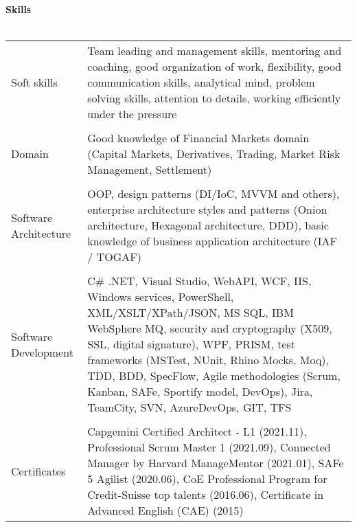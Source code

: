 \textbf{Skills}
\\
\\
\begin{tabular}{p{}|p{}}
Soft skills
& Team leading and management skills, mentoring and coaching, good organization of work, flexibility, good communication skills, analytical mind, problem solving skills, attention to details, working efficiently under the pressure \\
& \\
Domain
& Good knowledge of Financial Markets domain (Capital Markets, Derivatives, Trading, Market Risk Management, Settlement)\\
& \\
Software Architecture
& OOP, design patterns (DI/IoC, MVVM and others), enterprise architecture styles and patterns (Onion architecture, Hexagonal architecture, DDD), basic knowledge of business application architecture (IAF / TOGAF) \\
& \\
Software Development
& C\# .NET, Visual Studio, WebAPI, WCF, IIS, Windows services, PowerShell, XML/XSLT/XPath/JSON, MS SQL, IBM WebSphere MQ, security and cryptography (X509, SSL, digital signature), WPF, PRISM, test frameworks (MSTest, NUnit, Rhino Mocks, Moq), TDD, BDD, SpecFlow, Agile methodologies (Scrum, Kanban, SAFe, Sportify model, DevOps), Jira, TeamCity, SVN, AzureDevOps, GIT, TFS \\
& \\
Certificates
& Capgemini Certified Architect - L1 (2021.11), Professional Scrum Master 1 (2021.09), Connected Manager by Harvard ManageMentor (2021.01), SAFe 5 Agilist (2020.06), CoE Professional Program for Credit-Suisse top talents (2016.06), Certificate in Advanced English (CAE) (2015) \\
\end{tabular}